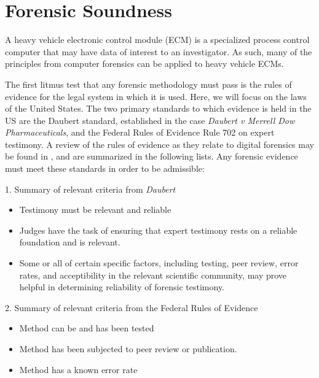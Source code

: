 \section{Forensic Soundness}

A heavy vehicle electronic control module (ECM) is a specialized process control computer that may have data of interest to an investigator. 
 As such, many of the principles from computer forensics can be applied to heavy vehicle ECMs.

The first litmus test that any forensic methodology must pass is the rules of evidence for the legal system in which it is used. Here, we will
focus on the laws of the United States. The two primary standards to which evidence is held in the US are the Daubert standard, established
in the case \emph{Daubert v Merrell Dow Pharmaceuticals}\cite{Daubert1993}, and the Federal Rules of Evidence Rule 702 on expert testimony\cite{FedRules702}. 
A review of the rules of evidence as they relate to 
digital forensics may be found in \cite{meyers2005}, and are summarized in the following lists. Any forensic
evidence must meet these standards in order to be admissible:


\begin{center}
1. Summary of relevant criteria from \emph{Daubert}
\end{center}
\begin{itemize}
  \item Testimony must be relevant and reliable
  \item Judges have the task of ensuring that expert testimony rests on a reliable
        foundation and is relevant.
  \item Some or all of certain specific factors, including testing, peer review, error
        rates, and acceptibility in the relevant scientific community, may prove helpful
        in determining reliability of forensic testimony.
\end{itemize}

\newpage

\begin{center}
 2. Summary of relevant criteria from the Federal Rules of Evidence
\begin{itemize}
  \item Method can be and has been tested
  \item Method has been subjected to peer review or publication.
  \item Method has a known error rate
\end{itemize}

\end{center}


